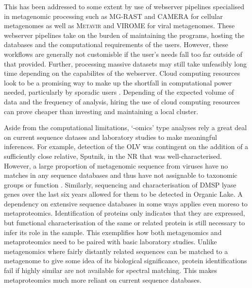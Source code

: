 This has been addressed to some extent by use of webserver pipelines specialised in metagenomic processing such as \ac{MG-RAST} \cite{Meyer2008} and \ac{CAMERA} \cite{Sun2011} for cellular metagenomes as well as \textsc{Metavir} \cite{Roux2011} and \textsc{VIROME} \cite{Wommack2012} for viral metagenomes.
These webserver pipelines take on the burden of maintaining the programs, hosting the databases and the computational requirements of the users.
However, these workflows are generally not customisble if the user's needs fall too far outside of that provided. 
Further, processing massive datasets may still take unfeasibly long time depending on the capabilites of the webserver.
Cloud computing resources look to be a promising way to make up the shortfall in computational power needed, particularly by sporadic users \cite{Anguioli2009}.
Depending of the expected volume of data and the frequency of analysis, hiring the use of cloud computing resources can prove cheaper than investing and maintaining a local cluster.


Aside from the computational limitations, `-omics' type analyses rely a great deal on current sequence datases and laboratory studies to make meaningful inferences.
For example, detection of the \ac{OLV} was contingent on the addition of a sufficiently close relative, Sputnik, in the \ac{NR} that was well-characterised.
However, a large proportion of metagenomic sequence from viruses have no matches in any sequence databases and thus have not assignable to taxonomic groups or function \cite{Lopez-Bueno2009}.
Similarly, sequencing and characterisation of \ac{DMSP} lyase genes over the last six years allowed for them to be detected in Organic Lake.
A dependency on extensive sequence databases in some ways applies even moreso to metaproteomics.
Identification of proteins only indicates that they are expressed, but functional characterisation of the same or related protein is still necessary to infer its role in the sample.
This exemplifies how both metagenomics and metaproteomics need to be paired with basic laboratory studies.
Unlike metagenomics where fairly distantly related sequences can be matched to a metagenome to give some idea of its biological significance, protein identifications fail if highly similar are not available for spectral matching.
This makes metaproteomics much more reliant on current sequence databases.

